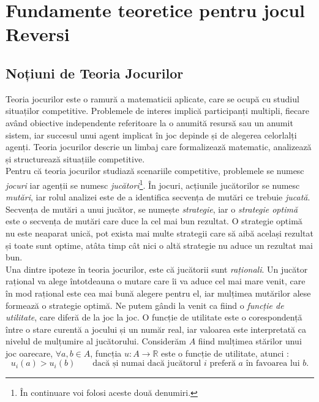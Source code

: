 \documentclass[12pt,twoside,a4paper,fleqn]{book}
\theoremstyle{definition}
\begin{document}
\chapter{Fundamente teoretice pentru jocul Reversi}
\section{Noțiuni de Teoria Jocurilor}
Teoria jocurilor este o ramură a matematicii aplicate, care se ocupă cu studiul situaților competitive. Problemele de interes implică participanți multipli, fiecare având obiective independente referitoare la o anumită resursă sau un anumit sistem, iar succesul unui agent implicat în joc depinde și de alegerea celorlalți agenți. Teoria jocurilor descrie un limbaj care formalizează matematic, analizează și structurează situațiile competitive.\cite{turocy} \\

Pentru că teoria jocurilor studiază scenariile competitive, problemele se numesc \emph{jocuri} iar agenții se numesc \emph{jucători}\footnote{În continuare voi folosi aceste două denumiri.}. În jocuri, acțiunile jucătorilor se numesc \emph{mutări}, iar rolul analizei este de a identifica secvența de mutări ce trebuie \emph{jucată}. Secvența de mutări a unui jucător, se numește \emph{strategie}, iar o \emph{strategie optimă} este o secvența de mutări care duce la cel mai bun rezultat. O strategie optimă nu este neaparat unică, pot exista mai multe strategii care să aibă același rezultat și toate sunt optime, atâta timp cât nici o altă strategie nu aduce un rezultat mai bun. \\
Una dintre ipoteze în teoria jocurilor, este că jucătorii sunt \emph{raționali}. Un jucător rațional va alege întotdeauna o mutare care îi va aduce cel mai mare venit, care în mod rațional este cea mai bună alegere pentru el, iar mulțimea mutărilor alese formează o strategie optimă.\label{rational} Ne putem gândi la venit ca fiind o \emph{funcție de utilitate}, care diferă de la joc la joc. O funcție de utilitate este o corespondență între o stare curentă a jocului și un număr real, iar valoarea este interpretată ca nivelul de mulțumire al jucătorului. Considerăm $A$ fiind mulțimea stărilor unui joc oarecare, $\forall a,b \in A$, funcția $u:A\rightarrow{}\mathbb{R}$ este o funcție de utilitate, atunci \cite{osborne}:
\begin{equation}
u_{i}(a) > u_{i}(b) \qquad{} \text{dacă și numai dacă jucătorul $i$ preferă $a$ în favoarea lui $b$.} 
\end{equation}
\end{document}
